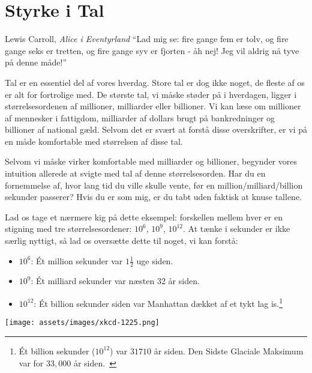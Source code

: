 \chapter{Styrke i Tal}
\label{les:15}

\begin{chapquote}{Lewis Carroll, \textit{Alice i Eventyrland}}
\enquote{Lad mig se: fire gange fem er tolv, og fire gange seks er tretten, og fire gange syv er fjorten - åh nej! Jeg vil aldrig nå tyve på denne måde!}
\end{chapquote}

Tal er en essentiel del af vores hverdag. Store tal er dog ikke noget, de fleste af os er alt for fortrolige med. De største tal, vi måske støder på i hverdagen, ligger i størrelsesordenen af millioner, milliarder eller billioner. Vi kan læse om millioner af mennesker i fattigdom, milliarder af dollars brugt på bankredninger og billioner af national gæld. Selvom det er svært at forstå disse overskrifter, er vi på en måde komfortable med størrelsen af disse tal.

Selvom vi måske virker komfortable med milliarder og billioner, begynder vores intuition allerede at svigte med tal af denne størrelsesorden. Har du en fornemmelse af, hvor lang tid du ville skulle vente, før en million/milliard/billion sekunder passerer? Hvis du er som mig, er du tabt uden faktisk at knuse tallene.

Lad os tage et nærmere kig på dette eksempel: forskellen mellem hver er en stigning med tre størrelsesordener: $10^6$, $10^9$, $10^{12}$. At tænke i sekunder er ikke særlig nyttigt, så lad os oversætte dette til noget, vi kan forstå:

\begin{itemize}
  \item $10^6$: Ét million sekunder var $1 \frac{1}{2}$ uge siden.
  \item $10^9$: Ét milliard sekunder var næsten 32 år siden.
  \item $10^{12}$: Ét billion sekunder siden var Manhattan dækket af et tykt lag
  is.\footnote{Ét billion sekunder ($10^{12}$) var $31710$ år siden. Den Sidste Glaciale
  Maksimum var for $33,000$ år siden.~\cite{wiki:LGM}}
\end{itemize}

\begin{center}
  \texttt{[image: assets/images/xkcd-1225.png]}
  \label{fig:xkcd-1225}
\end{center}

